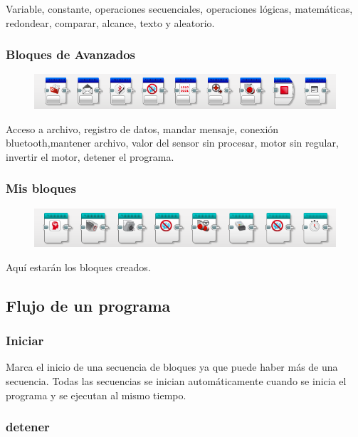 \documentclass[12pt,a4paper]{article}
\begin{document}
Variable, constante, operaciones secuenciales, operaciones lógicas, matemáticas,
redondear, comparar, alcance, texto y aleatorio.

\subsubsection{Bloques de Avanzados}

\begin{figure}[H]
	\includegraphics[scale=0.8]{avanzado.PNG}
	\centering
\end{figure}

Acceso a archivo, registro de datos, mandar mensaje, conexión bluetooth,mantener
archivo, valor del sensor sin procesar, motor sin regular, invertir el motor,
detener el programa.

\subsubsection{Mis bloques}

\begin{figure}[H]
	\includegraphics[scale=0.8]{BloquesPersonalizados.PNG}
	\centering
\end{figure}

Aquí estarán los bloques creados.

\subsection{Flujo de un programa}

\subsubsection{Iniciar}

Marca el inicio de una secuencia de bloques ya que puede haber más de una
secuencia. Todas las secuencias se inician automáticamente cuando se inicia el
programa y se ejecutan al mismo tiempo.

\subsubsection{detener}
\end{document}

